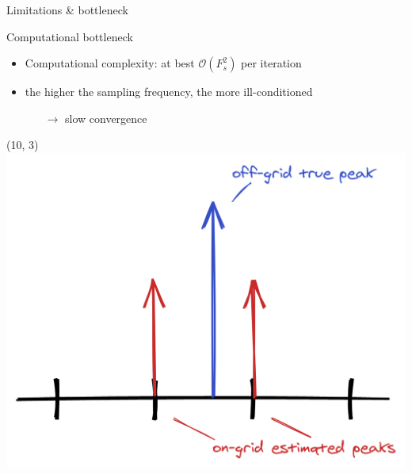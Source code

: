 \begin{frame}{Limitations \& bottleneck}
\begin{block}{Computational bottleneck}
\begin{itemize}
        \vspace*{.5em}

        \item Computational complexity: at best $\mathcal{O}(F_s^2)$ per iteration

        \item the higher the sampling frequency, the more ill-conditioned \\
        \begin{itemize}
            \item[$\longrightarrow$] slow convergence
        \end{itemize}
        \end{itemize}

    \end{block}

    \begin{textblock}{5}(10, 3)
        \includegraphics[width=\columnwidth]{figures/bodyguard.png}
    \end{textblock}

\end{frame}

\subsection{\blaster}

